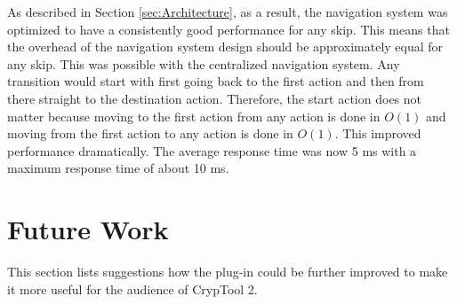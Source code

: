 \begin{enumerate}[label=(\labelenum{S}{{\arabic*}}), wide, labelwidth=!, labelindent=0pt]
As described in Section \ref{sec:Architecture}, as a result, the navigation system was optimized to have a consistently good performance for any skip. This means that the overhead of the navigation system design should be approximately equal for any skip. This was possible with the centralized navigation system. Any transition would start with first going back to the first action and then from there straight to the destination action. Therefore, the start action does not matter because moving to the first action from any action is done in $O(1)$ and moving from the first action to any action is done in $O(1)$. This improved performance dramatically. The average response time was now 5 ms with a maximum response time of about 10 ms.


\end{enumerate}

\section{Future Work}
\label{sec:futureWork}

This section lists suggestions how the plug-in could be further improved to make it more useful for the audience of CrypTool 2.

